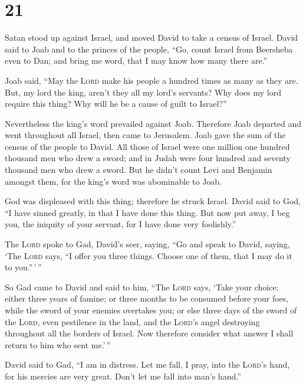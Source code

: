 \hypertarget{section-20}{%
\section{21}\label{section-20}}

 Satan stood up against Israel, and moved David to take a
census of Israel.  David said to Joab and to the princes
of the people, ``Go, count Israel from Beersheba even to Dan; and bring
me word, that I may know how many there are.''

 Joab said, ``May the \textsc{Lord} make his people a
hundred times as many as they are. But, my lord the king, aren't they
all my lord's servants? Why does my lord require this thing? Why will he
be a cause of guilt to Israel?''

 Nevertheless the king's word prevailed against Joab.
Therefore Joab departed and went throughout all Israel, then came to
Jerusalem.  Joab gave the sum of the census of the people
to David. All those of Israel were one million one hundred thousand men
who drew a sword; and in Judah were four hundred and seventy thousand
men who drew a sword.  But he didn't count Levi and
Benjamin amongst them, for the king's word was abominable to Joab.

 God was displeased with this thing; therefore he struck
Israel.  David said to God, ``I have sinned greatly, in
that I have done this thing. But now put away, I beg you, the iniquity
of your servant, for I have done very foolishly.''

 The \textsc{Lord} spoke to Gad, David's seer, saying,
 ``Go and speak to David, saying, `The \textsc{Lord}
says, ``I offer you three things. Choose one of them, that I may do it
to you.''\,'\,''

 So Gad came to David and said to him, ``The
\textsc{Lord} says, `Take your choice:  either three
years of famine; or three months to be consumed before your foes, while
the sword of your enemies overtakes you; or else three days of the sword
of the \textsc{Lord}, even pestilence in the land, and the
\textsc{Lord}'s angel destroying throughout all the borders of Israel.
Now therefore consider what answer I shall return to him who sent
me.'\,''

 David said to Gad, ``I am in distress. Let me fall, I
pray, into the \textsc{Lord}'s hand, for his mercies are very great.
Don't let me fall into man's hand.''

